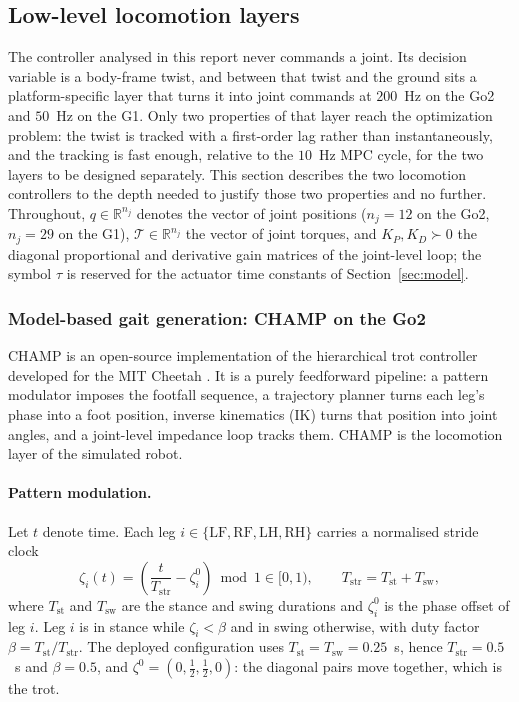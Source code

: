 \documentclass[11pt,a4paper]{article}
\newcommand{\R}{\mathbb{R}}
\newcommand{\Tstr}{T_{\mathrm{str}}}
\newcommand{\Tst}{T_{\mathrm{st}}}
\newcommand{\Tsw}{T_{\mathrm{sw}}}
\begin{document}
\subsection{Low-level locomotion layers}
\label{sec:lowlevel}

The controller analysed in this report never commands a joint. Its decision variable is a body-frame twist,
and between that twist and the ground sits a platform-specific layer that turns it into joint commands at
$200$~Hz on the Go2 and $50$~Hz on the G1. Only two properties of that layer reach the optimization problem:
the twist is tracked with a first-order lag rather than instantaneously, and the tracking is fast enough,
relative to the $10$~Hz MPC cycle, for the two layers to be designed separately. This section describes the
two locomotion controllers to the depth needed to justify those two properties and no further. Throughout, $q\in\R^{n_j}$
denotes the vector of joint positions ($n_j=12$ on the Go2, $n_j=29$ on the G1), $\mathcal{T}\in\R^{n_j}$ the
vector of joint torques, and $K_P,K_D\succ0$ the diagonal proportional and derivative gain matrices of the
joint-level loop; the symbol $\tau$ is reserved for the actuator time constants of
Section~\ref{sec:model}.

\subsubsection{Model-based gait generation: CHAMP on the Go2}
\label{sec:champ}

CHAMP \cite{champ} is an open-source implementation of the hierarchical trot controller developed for the MIT
Cheetah \cite{lee2013hierarchical,hyun2014trot}. It is a purely feedforward pipeline: a pattern modulator
imposes the footfall sequence, a trajectory planner turns each leg's phase into a foot position, inverse
kinematics (IK) turns that position into joint angles, and a joint-level impedance loop tracks them. CHAMP is the locomotion layer of the simulated robot.

\paragraph{Pattern modulation.} Let $t$ denote time. Each leg $i\in\{\mathrm{LF},\mathrm{RF},\mathrm{LH},
\mathrm{RH}\}$ carries a normalised stride clock
\begin{equation}
  \zeta_i(t)=\left(\frac{t}{\Tstr}-\zeta_i^{0}\right)\bmod 1\in[0,1),
  \qquad \Tstr=\Tst+\Tsw ,
  \label{eq:gaitphase}
\end{equation}
where $\Tst$ and $\Tsw$ are the stance and swing durations and $\zeta_i^{0}$ is the phase offset of leg $i$.
Leg $i$ is in stance while $\zeta_i<\beta$ and in swing otherwise, with duty factor $\beta=\Tst/\Tstr$. The
deployed configuration uses $\Tst=\Tsw=0.25$~s, hence $\Tstr=0.5$~s and $\beta=0.5$, and
$\zeta^{0}=(0,\tfrac12,\tfrac12,0)$: the diagonal pairs move together, which is the trot.
\end{document}
